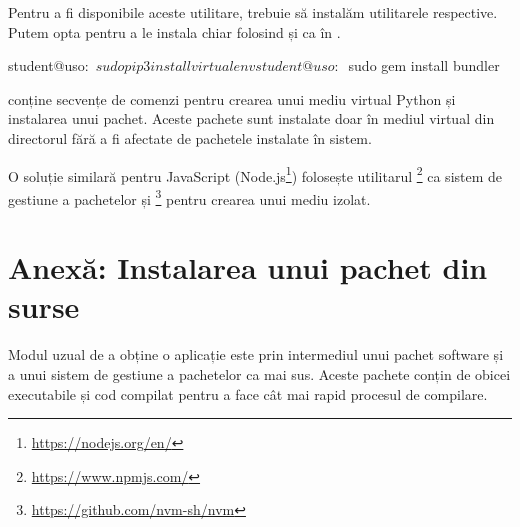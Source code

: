 Pentru a fi disponibile aceste utilitare, trebuie să instalăm utilitarele respective. Putem opta pentru a le instala chiar folosind  și  ca în .

\begin{screen}[caption={Instalarea utilitarelor virtualenv și rvm},label={lst:package:install-venv-bundler}]
student@uso:~$ sudo pip3 install virtualenv

student@uso:~$ sudo gem install bundler
\end{screen}

 conține secvențe de comenzi pentru crearea unui mediu virtual Python și instalarea unui pachet. Aceste pachete sunt instalate doar în mediul virtual din directorul  fără a fi afectate de pachetele instalate în sistem.


O soluție similară pentru JavaScript (Node.js\footnote{\url{https://nodejs.org/en/}}) folosește utilitarul \footnote{\url{https://www.npmjs.com/}} ca sistem de gestiune a pachetelor și \footnote{\url{https://github.com/nvm-sh/nvm}} pentru crearea unui mediu izolat.

\section{Anexă: Instalarea unui pachet din surse}
\label{sec:package:source}

Modul uzual de a obține o aplicație este prin intermediul unui pachet software și a unui sistem de gestiune a pachetelor ca mai sus. Aceste pachete conțin de obicei executabile și cod compilat pentru a face cât mai rapid procesul de compilare.

